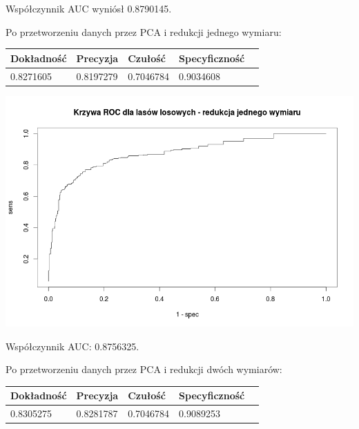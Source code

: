 \documentclass{article}
\begin{document}
Współczynnik AUC wyniósł 0.8790145.

Po przetworzeniu danych przez PCA i redukcji jednego wymiaru:

\begin{center}
    \begin{tabular}{| l | l | l | l | l|}
    \hline
        Dokładność &  Precyzja &  Czułość & Specyficzność \\ \hline
      	 0.8271605 & 0.8197279 & 0.7046784 & 0.9034608 \\
    \hline
    \end{tabular}
\end{center}

\begin{center}
	\includegraphics[scale=0.40]{images/forest1.png}
\end{center}

Współczynnik AUC: 0.8756325.

Po przetworzeniu danych przez PCA i redukcji dwóch wymiarów:

\begin{center}
    \begin{tabular}{| l | l | l | l | l|}
    \hline
        Dokładność &  Precyzja &  Czułość & Specyficzność \\ \hline
      	0.8305275 & 0.8281787 & 0.7046784 & 0.9089253  \\
    \hline
    \end{tabular}
\end{center}
\end{document}
